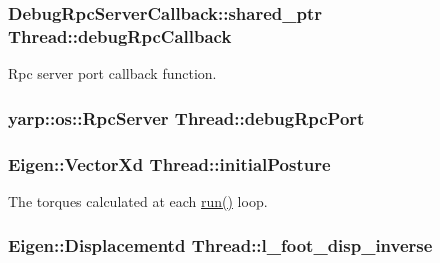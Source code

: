\hypertarget{classThread_a42833af67d5280e6946a31a03737e017}{
\subsubsection[{debug\-Rpc\-Callback}]{\setlength{\rightskip}{0pt plus 5cm}\-Debug\-Rpc\-Server\-Callback\-::shared\-\_\-ptr {\bf \-Thread\-::debug\-Rpc\-Callback}}}\label{classThread_a42833af67d5280e6946a31a03737e017}
\-Rpc server port callback function. \hypertarget{classThread_aa6b8f3712e7776d560b0a535eff73c34}{
\subsubsection[{debug\-Rpc\-Port}]{\setlength{\rightskip}{0pt plus 5cm}yarp\-::os\-::\-Rpc\-Server {\bf \-Thread\-::debug\-Rpc\-Port}}}\label{classThread_aa6b8f3712e7776d560b0a535eff73c34}
\hypertarget{classThread_aa59863bb50c8aa88fe5872e75be44cb7}{
\subsubsection[{initial\-Posture}]{\setlength{\rightskip}{0pt plus 5cm}\-Eigen\-::\-Vector\-Xd {\bf \-Thread\-::initial\-Posture}}}\label{classThread_aa59863bb50c8aa88fe5872e75be44cb7}
\-The torques calculated at each \hyperlink{classThread_ad9373d8d725c46717dfce3130018fe3a}{run()} loop. \hypertarget{classThread_a304e7ee40ec0ceec2fc7ca80353ab478}{
\subsubsection[{l\-\_\-foot\-\_\-disp\-\_\-inverse}]{\setlength{\rightskip}{0pt plus 5cm}\-Eigen\-::\-Displacementd {\bf \-Thread\-::l\-\_\-foot\-\_\-disp\-\_\-inverse}}}\label{classThread_a304e7ee40ec0ceec2fc7ca80353ab478}
